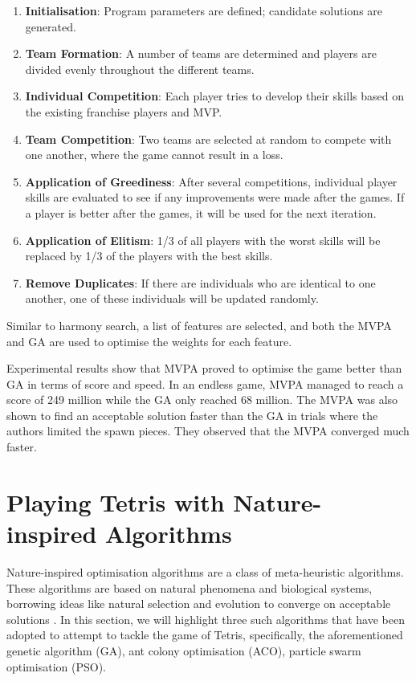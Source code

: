 \documentclass[a4paper, 12pt]{extreport}
\begin{document}
	\begin{enumerate}
		\item \textbf{Initialisation}: Program parameters are defined; candidate solutions are generated.
		\item \textbf{Team Formation}: A number of teams are determined and players are divided evenly throughout the different teams.
		\item \textbf{Individual Competition}: Each player tries to develop their skills based on the existing franchise players and MVP.
		\item \textbf{Team Competition}: Two teams are selected at random to compete with one another, where the game cannot result in a loss.
		\item \textbf{Application of Greediness}: After several competitions, individual player skills are evaluated to see if any improvements were made after the games. If a player is better after the games, it will be used for the next iteration.
		\item \textbf{Application of Elitism}: 1/3 of all players with the worst skills will be replaced by 1/3 of the players with the best skills.
		\item \textbf{Remove Duplicates}: If there are individuals who are identical to one another, one of these individuals will be updated randomly.
	\end{enumerate}
	
	Similar to harmony search, a list of features are selected, and both the MVPA and GA are used to optimise the weights for each feature.
	
	Experimental results show that MVPA proved to optimise the game better than GA in terms of score and speed. In an endless game, MVPA managed to reach a score of 249 million while the GA only reached 68 million. The MVPA was also shown to find an acceptable solution faster than the GA in trials where the authors limited the spawn pieces. They observed that the MVPA converged much faster.
	
	\section{Playing Tetris with Nature-inspired Algorithms}
	
	Nature-inspired optimisation algorithms are a class of meta-heuristic algorithms. These algorithms are based on natural phenomena and biological systems, borrowing ideas like natural selection and evolution to converge on acceptable solutions \cite{nia-soft-computing}. In this section, we will highlight three such algorithms that have been adopted to attempt to tackle the game of Tetris, specifically, the aforementioned genetic algorithm (GA), ant colony optimisation (ACO), particle swarm optimisation (PSO).
	
\end{document}
